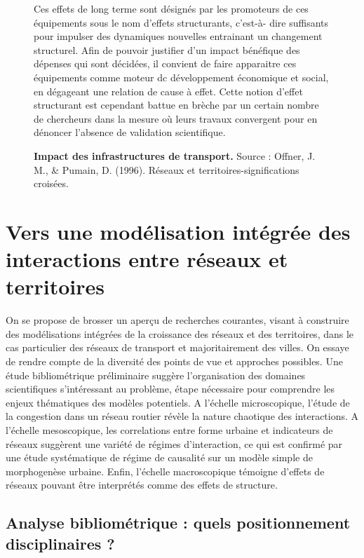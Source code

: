 \begin{figure}[h!]
\begin{mdframed}
Ces effets de long terme sont désignés par les promoteurs de ces équipements sous le nom d’effets structurants, c’est-à-
dire suffisants pour impulser des dynamiques nouvelles entrainant un changement structurel. Afin de pouvoir justifier d’un
impact bénéfique des dépenses qui sont décidées, il convient
de faire apparaitre ces équipements comme moteur dc développement économique et social, en dégageant une relation de cause à effet. Cette notion d’effet structurant est cependant
battue en brèche par un certain nombre de chercheurs dans la
mesure où leurs travaux convergent pour en dénoncer l’absence de validation scientifique.


\end{mdframed}

\caption{\textbf{Impact des infrastructures de transport.} Source : Offner, J. M., \& Pumain, D. (1996). Réseaux et territoires-significations croisées.}
\label{doc:offner-pumain}

\end{figure}




\section{Vers une modélisation intégrée des interactions entre réseaux et territoires}

On se propose de brosser un aperçu de recherches courantes, visant à construire des modélisations intégrées de la croissance des réseaux et des territoires, dans le cas particulier des réseaux de transport et majoritairement des villes. On essaye de rendre compte de la diversité des points de vue et approches possibles. Une étude bibliométrique préliminaire suggère l'organisation des domaines scientifiques s'intéressant au problème, étape nécessaire pour comprendre les enjeux thématiques des modèles potentiels. A l'échelle microscopique, l'étude de la congestion dans un réseau routier révèle la nature chaotique des interactions. A l'échelle mesoscopique, les correlations entre forme urbaine et indicateurs de réseaux suggèrent une variété de régimes d'interaction, ce qui est confirmé par une étude systématique de régime de causalité sur un modèle simple de morphogenèse urbaine. Enfin, l'échelle macroscopique témoigne d'effets de réseaux pouvant être interprétés comme des effets de structure.


\subsection{Analyse bibliométrique : quels positionnement disciplinaires ?}

